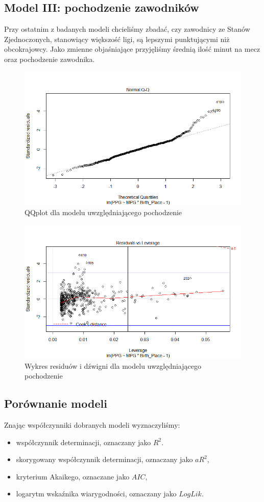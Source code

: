 \documentclass[11pt,a4paper]{article}
\begin{document}
\subsection{Model III: pochodzenie zawodników}
Przy ostatnim z badanych modeli chcieliśmy zbadać, czy zawodnicy ze Stanów Zjednoczonych, stanowiący większość ligi, są lepszymi punktującymi niż obcokrajowcy.
Jako zmienne objaśniające przyjęliśmy średnią ilość minut na mecz oraz pochodzenie zawodnika.
\begin{figure}[t]
\includegraphics[width=\textwidth]{origin_2}
\caption{QQplot dla modelu uwzględniającego pochodzenie}
\label{qqplot_origin}
\centering
\end{figure}
\begin{figure}[t]
\includegraphics[width=\textwidth]{origin_4}
\caption{Wykres residuów i dźwigni dla modelu uwzględniającego pochodzenie}
\label{leverage_origin}
\centering
\end{figure}

\subsection{Porównanie modeli}
Znając współczynniki dobranych modeli wyznaczyliśmy:
\begin{itemize}
	\item współczynnik determinacji, oznaczany jako $R^2$.
	\item skorygowany współczynnik determinacji, oznaczany jako $aR^2$,
	\item kryterium Akaikego, oznaczane jako $AIC$,
	\item logarytm wskaźnika wiarygodności, oznaczany jako $LogLik$.
\end{itemize}
\end{document}

